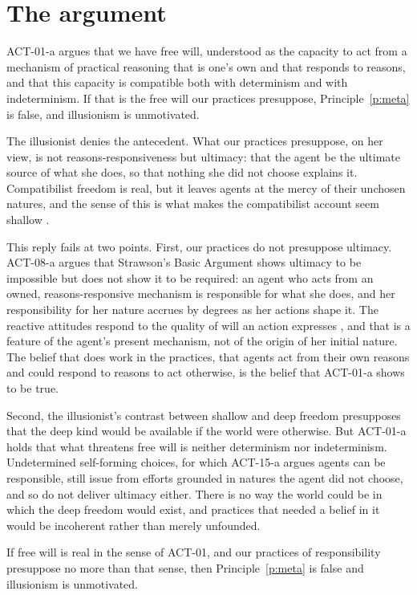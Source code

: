 \documentclass{situationist-preprint}
\begin{document}
\section{The argument}

ACT-01-a argues that we have free will, understood as the capacity to act from a mechanism of practical reasoning that is one's own and that responds to reasons, and that this capacity is compatible both with determinism and with indeterminism. If that is the free will our practices presuppose, Principle~\ref{p:meta} is false, and illusionism is unmotivated.

The illusionist denies the antecedent. What our practices presuppose, on her view, is not reasons-responsiveness but ultimacy: that the agent be the ultimate source of what she does, so that nothing she did not choose explains it. Compatibilist freedom is real, but it leaves agents at the mercy of their unchosen natures, and the sense of this is what makes the compatibilist account seem shallow \citep{Smilansky2000}.

This reply fails at two points. First, our practices do not presuppose ultimacy. ACT-08-a argues that Strawson's Basic Argument shows ultimacy to be impossible but does not show it to be required: an agent who acts from an owned, reasons-responsive mechanism is responsible for what she does, and her responsibility for her nature accrues by degrees as her actions shape it. The reactive attitudes respond to the quality of will an action expresses \citep{Strawson1962}, and that is a feature of the agent's present mechanism, not of the origin of her initial nature. The belief that does work in the practices, that agents act from their own reasons and could respond to reasons to act otherwise, is the belief that ACT-01-a shows to be true.

Second, the illusionist's contrast between shallow and deep freedom presupposes that the deep kind would be available if the world were otherwise. But ACT-01-a holds that what threatens free will is neither determinism nor indeterminism. Undetermined self-forming choices, for which ACT-15-a argues agents can be responsible, still issue from efforts grounded in natures the agent did not choose, and so do not deliver ultimacy either. There is no way the world could be in which the deep freedom would exist, and practices that needed a belief in it would be incoherent rather than merely unfounded.

\begin{proposition}\label{p:main}
If free will is real in the sense of ACT-01, and our practices of responsibility presuppose no more than that sense, then Principle~\ref{p:meta} is false and illusionism is unmotivated.
\end{proposition}
\end{document}
